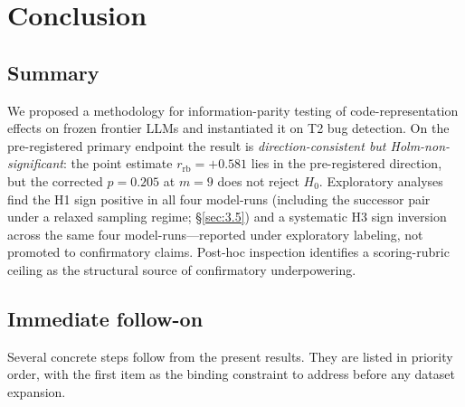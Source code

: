 \documentclass[11pt]{article}
\begin{document}
\section{Conclusion}
\label{sec:6}

\subsection{Summary}
\label{sec:6.1}
We proposed a methodology for information-parity testing of
code-representation effects on frozen frontier LLMs and
instantiated it on T2 bug detection. On the pre-registered
primary endpoint the result is \emph{direction-consistent but
Holm-non-significant}: the point estimate
$r_{\text{rb}} = +0.581$ lies in the pre-registered direction,
but the corrected $p = 0.205$ at $m = 9$ does not reject $H_0$. Exploratory
analyses find the H1 sign positive in all four model-runs
(including the successor pair under a relaxed sampling regime;
\S\ref{sec:3.5}) and a systematic H3 sign inversion across the
same four model-runs---reported under exploratory labeling, not
promoted to confirmatory claims. Post-hoc inspection identifies a
scoring-rubric ceiling as the structural source of confirmatory
underpowering.

\subsection{Immediate follow-on}
\label{sec:6.2}
Several concrete steps follow from the present results. They are
listed in priority order, with the first item as the binding
constraint to address before any dataset expansion.
\end{document}
